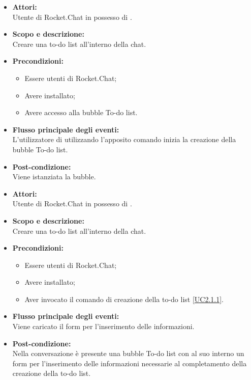 
\begin{itemize}
	\item \textbf{Attori:}
	\\Utente di Rocket.Chat in possesso di \ProjectName{}.
	\item \textbf{Scopo e descrizione:} 
	\\Creare una to-do list all'interno della chat.
	\item \textbf{Precondizioni:}
	\begin{itemize}
		\item Essere utenti di Rocket.Chat;
		\item Avere \ProjectName{} installato;
		\item Avere accesso alla bubble To-do list.
	\end{itemize}
	\item \textbf{Flusso principale degli eventi:}
	\\L'utilizzatore di \ProjectName{} utilizzando l'apposito comando inizia la creazione della bubble To-do list.
	\item \textbf{Post-condizione:}
	\\Viene istanziata la bubble.
\end{itemize}


\begin{itemize}
	\item \textbf{Attori:}
	\\Utente di Rocket.Chat in possesso di \ProjectName{}.
	\item \textbf{Scopo e descrizione:} 
	\\Creare una to-do list all'interno della chat.
	\item \textbf{Precondizioni:}
	\begin{itemize}
		\item Essere utenti di Rocket.Chat;
		\item Avere \ProjectName{} installato;
		\item Aver invocato il comando di creazione della to-do list \ref{UC2.1.1}.
	\end{itemize}
	\item \textbf{Flusso principale degli eventi:}
	\\Viene caricato il form per l'inserimento delle informazioni.
	\item \textbf{Post-condizione:}
	\\Nella conversazione è presente una bubble To-do list con al suo interno un form per l'inserimento delle informazioni necessarie al completamento della creazione della to-do list.
\end{itemize}

